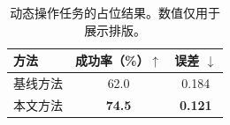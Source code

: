 \begin{table}[t]
  \centering
  \caption{动态操作任务的占位结果。数值仅用于展示排版。}
  \label{tab:example}
  \begin{tabular}{lcc}
    \toprule
    方法 & 成功率（\%）$\uparrow$ & 误差 $\downarrow$ \\
    \midrule
    基线方法 & 62.0 & 0.184 \\
    本文方法 & \textbf{74.5} & \textbf{0.121} \\
    \bottomrule
  \end{tabular}
\end{table}
